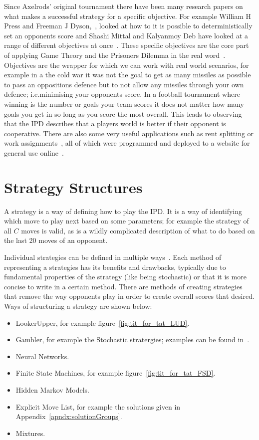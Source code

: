 Since Axelrods' original tournament there have been many research papers on what makes a successful strategy for a specific objective.
For example William H Press and Freeman J Dyson,~\cite{press2012iterated}, looked at how to it is possible to deterministically set an opponents score and Shashi Mittal and Kalyanmoy Deb have looked at a range of different objectives at once~\cite{mittal2009optimal}.
These specific objectives are the core part of applying Game Theory and the Prisoners Dilemma in the real word~\cite{rehmeyer2012climateNegotiations,osang2013environmental,Schneier2012doping}.
Objectives are the wrapper for which we can work with real world scenarios, for example in a the cold war it was not the goal to get as many missiles as possible to pass an oppositions defence but to not allow any missiles through your own defence; i.e.minimising your opponents score.
In a football tournament where winning is the number or goals your team scores it does not matter how many goals you get in so long as you score the most overall.
This leads to observing that the IPD describes that a players world is better if their opponent is cooperative.  
There are also some very useful applications such as rent splitting or work assignments~\cite{goldman2015spliddit}, all of which were programmed and deployed to a website for general use online~\cite{spliddit}.

\section{Strategy Structures}\label{sec:stratergyStructures}
A strategy is a way of defining how to play the IPD. 
It is a way of identifying which move to play next based on some parameters; for example the strategy of all $C$ moves is valid, as is a wildly complicated description of what to do based on the last 20 moves of an opponent.

Individual strategies can be defined in multiple ways~\cite{harper2017reinforcement}.
Each method of representing a strategies has its benefits and drawbacks, typically due to fundamental properties of the strategy (like being stochastic) or that it is more concise to write in a certain method.
There are methods of creating strategies that remove the way opponents play in order to create overall scores that desired.
Ways of structuring a strategy are shown below:

\begin{itemize}
 \item LookerUpper, for example figure~\ref{fig:tit_for_tat_LUD}.
 \item Gambler, for example the Stochastic stratergies; examples can be found in~\cite{press2012iterated}.
 \item Neural Networks.
 \item Finite State Machines, for example figure~\ref{fig:tit_for_tat_FSD}.
 \item Hidden Markov Models.
 \item Explicit Move List, for example the solutions given in Appendix~\ref{apndx:solutionGroups}.
 \item Mixtures.
\end{itemize}

